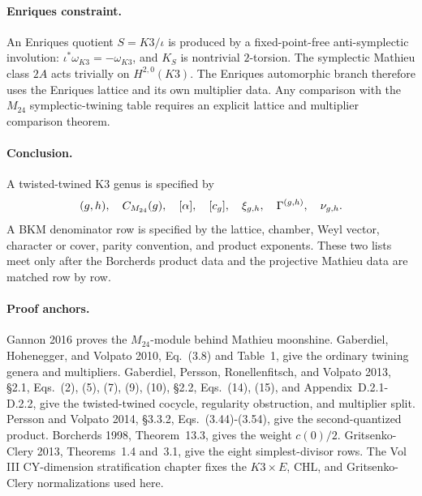 \paragraph{Enriques constraint.}
An Enriques quotient \(S=K3/\iota\) is produced by a fixed-point-free
anti-symplectic involution: \(\iota^*\omega_{K3}=-\omega_{K3}\), and
\(K_S\) is nontrivial \(2\)-torsion.  The symplectic Mathieu class
\(2A\) acts trivially on \(H^{2,0}(K3)\).  The Enriques automorphic
branch therefore uses the Enriques lattice and its own multiplier data.
Any comparison with the \(M_{24}\) symplectic-twining table requires an
explicit lattice and multiplier comparison theorem.

\paragraph{Conclusion.}
A twisted-twined K3 genus is specified by
\[
  (g,h),\quad C_{M_{24}}(g),\quad [\alpha],\quad [c_g],\quad
  \xi_{g,h},\quad \Gamma^{(g,h)},\quad \nu_{g,h}.
\]
A BKM denominator row is specified by the lattice, chamber, Weyl vector,
character or cover, parity convention, and product exponents.  These two
lists meet only after the Borcherds product data and the projective
Mathieu data are matched row by row.

\paragraph{Proof anchors.}
Gannon 2016 proves the \(M_{24}\)-module behind Mathieu moonshine.
Gaberdiel, Hohenegger, and Volpato 2010, Eq.~(3.8) and Table~1, give
the ordinary twining genera and multipliers.  Gaberdiel, Persson,
Ronellenfitsch, and Volpato 2013, \S2.1, Eqs.~(2), (5), (7), (9), (10),
\S2.2, Eqs.~(14), (15), and Appendix~D.2.1-D.2.2, give the
twisted-twined cocycle, regularity obstruction, and multiplier split.
Persson and Volpato 2014, \S3.3.2, Eqs.~(3.44)-(3.54), give the
second-quantized product.  Borcherds 1998, Theorem~13.3, gives the
weight \(c(0)/2\).  Gritsenko-Clery 2013, Theorems~1.4 and~3.1, give
the eight simplest-divisor rows.  The Vol III CY-dimension
stratification chapter fixes the \(K3\times E\), CHL, and
Gritsenko-Clery normalizations used here.
